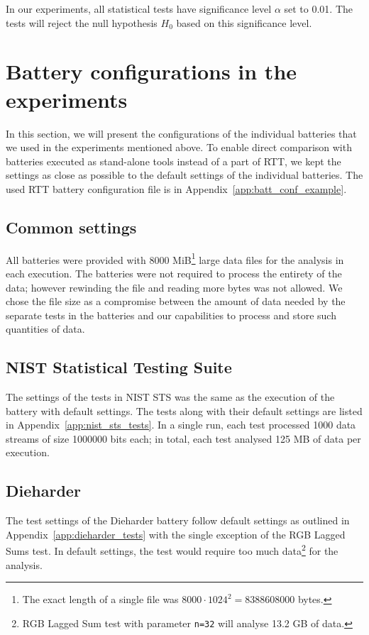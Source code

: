 \documentclass[
	digital,    %
	oneside,    %
	color,
	11pt,
	nocover,
	notable,
	nolof,
	nolot,
]{fithesis3}
\theoremstyle{definition}
\theoremstyle{remark}
\begin{document}
In our experiments, all statistical tests have significance level $\alpha$ set to 0.01. The tests will reject the null hypothesis $H_0$ based on this significance level.

\section{Battery configurations in the experiments}
\label{sec:configuration_of_batteries}
In this section, we will present the configurations of the individual batteries that we used in the experiments mentioned above. To enable direct comparison with batteries executed as stand-alone tools instead of a part of RTT, we kept the settings as close as possible to the default settings of the individual batteries. The used RTT battery configuration file is in Appendix~\ref{app:batt_conf_example}.

\subsection{Common settings}
All batteries were provided with 8000 MiB\footnote{The exact length of a single file was $8000 \cdot 1024^2 = 8388608000$ bytes.} large data files for the analysis in each execution. The batteries were not required to process the entirety of the data; however rewinding the file and reading more bytes was not allowed. We chose the file size as a compromise between the amount of data needed by the separate tests in the batteries and our capabilities to process and store such quantities of data.

\subsection*{NIST Statistical Testing Suite}
The settings of the tests in NIST STS was the same as the execution of the battery with default settings. The tests along with their default settings are listed in Appendix~\ref{app:nist_sts_tests}. In a single run, each test processed 1000 data streams of size 1000000 bits each; in total, each test analysed 125 MB of data per execution.

\subsection*{Dieharder}
The test settings of the Dieharder battery follow default settings as outlined in Appendix~\ref{app:dieharder_tests} with the single exception of the RGB Lagged Sums test. In default settings, the test would require too much data\footnote{RGB Lagged Sum test with parameter \texttt{n=32} will analyse 13.2 GB of data.} for the analysis. 
\end{document}
